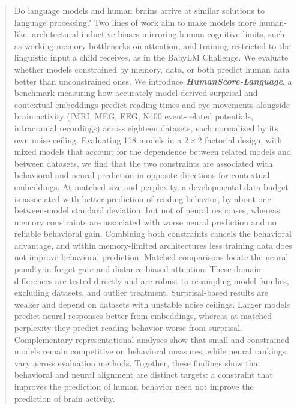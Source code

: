 \begin{abstract}
Do language models and human brains arrive at similar solutions to language processing? Two lines of work aim to make models more human-like: architectural inductive biases mirroring human cognitive limits, such as working-memory bottlenecks on attention, and training restricted to the linguistic input a child receives, as in the BabyLM Challenge. We evaluate whether models constrained by memory, data, or both predict human data better than unconstrained ones. We introduce \textit{\textbf{HumanScore-Language}}, a benchmark measuring how accurately model-derived surprisal and contextual embeddings predict reading times and eye movements alongside brain activity (fMRI, MEG, EEG, N400 event-related potentials, intracranial recordings) across eighteen datasets, each normalized by its own noise ceiling. Evaluating 118 models in a $2\times2$ factorial design, with mixed models that account for the dependence between related models and between datasets, we find that the two constraints are associated with behavioral and neural prediction in opposite directions for contextual embeddings. At matched size and perplexity, a developmental data budget is associated with better prediction of reading behavior, by about one between-model standard deviation, but not of neural responses, whereas memory constraints are associated with worse neural prediction and no reliable behavioral gain. Combining both constraints cancels the behavioral advantage, and within memory-limited architectures less training data does not improve behavioral prediction. Matched comparisons locate the neural penalty in forget-gate and distance-biased attention. These domain differences are tested directly and are robust to resampling model families, excluding datasets, and outlier treatment. Surprisal-based results are weaker and depend on datasets with unstable noise ceilings. Larger models predict neural responses better from embeddings, whereas at matched perplexity they predict reading behavior worse from surprisal. Complementary representational analyses show that small and constrained models remain competitive on behavioral measures, while neural rankings vary across evaluation methods. Together, these findings show that behavioral and neural alignment are distinct targets: a constraint that improves the prediction of human behavior need not improve the prediction of brain activity.
\end{abstract}
